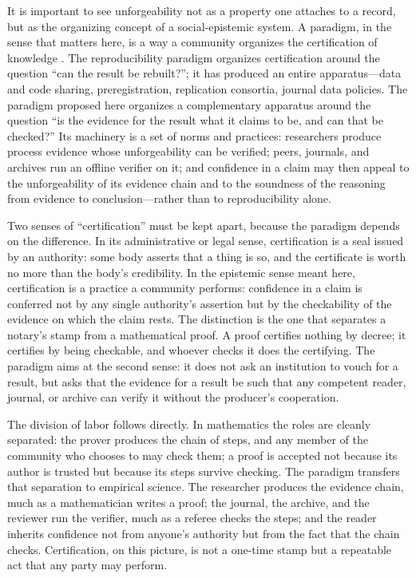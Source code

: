 \documentclass[11pt]{article}
\begin{document}
It is important to see unforgeability not as a property one attaches to a record, but
as the organizing concept of a social-epistemic system. A paradigm, in the sense that
matters here, is a way a community organizes the certification of knowledge
\parencite{kuhn1962}. The reproducibility paradigm organizes certification around the
question ``can the result be rebuilt?''; it has produced an entire apparatus---data and
code sharing, preregistration, replication consortia, journal data policies. The
paradigm proposed here organizes a complementary apparatus around the question ``is the
evidence for the result what it claims to be, and can that be checked?'' Its machinery
is a set of norms and practices: researchers produce process evidence whose
unforgeability can be verified; peers, journals, and archives run an offline verifier on
it; and confidence in a claim may then appeal to the unforgeability of its evidence
chain and to the soundness of the reasoning from evidence to conclusion---rather than to
reproducibility alone.

Two senses of ``certification'' must be kept apart, because the paradigm depends on the
difference. In its administrative or legal sense, certification is a seal issued by an
authority: some body asserts that a thing is so, and the certificate is worth no more
than the body's credibility. In the epistemic sense meant here, certification is a
practice a community performs: confidence in a claim is conferred not by any single
authority's assertion but by the checkability of the evidence on which the claim rests.
The distinction is the one that separates a notary's stamp from a mathematical proof. A
proof certifies nothing by decree; it certifies by being checkable, and whoever checks it
does the certifying. The paradigm aims at the second sense: it does not ask an
institution to vouch for a result, but asks that the evidence for a result be such that
any competent reader, journal, or archive can verify it without the producer's
cooperation.

The division of labor follows directly. In mathematics the roles are cleanly separated:
the prover produces the chain of steps, and any member of the community who chooses to
may check them; a proof is accepted not because its author is trusted but because its
steps survive checking. The paradigm transfers that separation to empirical science. The
researcher produces the evidence chain, much as a mathematician writes a proof; the
journal, the archive, and the reviewer run the verifier, much as a referee checks the
steps; and the reader inherits confidence not from anyone's authority but from the fact
that the chain checks. Certification, on this picture, is not a one-time stamp but a
repeatable act that any party may perform.
\end{document}
